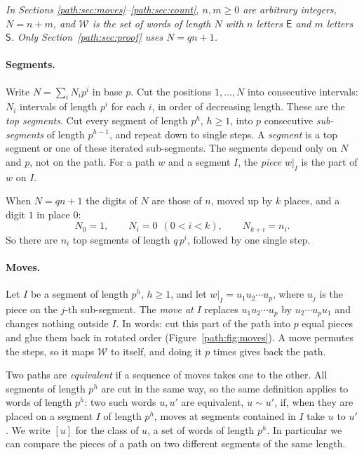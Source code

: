 \documentclass[11pt]{article}
\theoremstyle{definition}
\theoremstyle{remark}
\numberwithin{equation}{section}
\numberwithin{figure}{section}
\newcommand{\E}{\textsf{E}}
\newcommand{\Ss}{\textsf{S}}
\newcommand{\W}{\mathcal{W}}
\begin{document}
\emph{In Sections \ref{path:sec:moves}--\ref{path:sec:count}, $n,m\ge 0$ are arbitrary integers, $N=n+m$, and $\W$ is the set of words of length $N$
with $n$ letters $\E$ and $m$ letters $\Ss$. Only Section~\ref{path:sec:proof} uses $N=qn+1$.}

\paragraph{Segments.} Write $N=\sum_i N_ip^i$ in base $p$. Cut the positions $1,\dots,N$ into consecutive intervals:
$N_i$ intervals of length $p^i$ for each $i$, in order of decreasing length. These are the \emph{top segments}.
Cut every segment of length $p^h$, $h\ge1$, into $p$ consecutive \emph{sub-segments} of length $p^{h-1}$, and
repeat down to single steps. A \emph{segment} is a top segment or one of these iterated sub-segments.
The segments depend only on $N$ and $p$, not on the path. For a path $w$ and a segment $I$, the
\emph{piece} $w|_I$ is the part of $w$ on $I$.

When $N=qn+1$ the digits of $N$ are those of $n$, moved up by $k$ places, and a digit $1$ in place $0$:
\begin{equation}\label{path:eq:digitsN}
N_0=1,\qquad N_i=0\ \ (0<i<k),\qquad N_{k+i}=n_i .
\end{equation}
So there are $n_i$ top segments of length $q\,p^i$, followed by one single step.

\paragraph{Moves.} Let $I$ be a segment of length $p^h$, $h\ge 1$, and let $w|_I=u_1u_2\cdots u_p$, where $u_j$
is the piece on the $j$-th sub-segment. The \emph{move at $I$} replaces $u_1u_2\cdots u_p$ by $u_2\cdots u_pu_1$ and
changes nothing outside $I$. In words: cut this part of the path into $p$ equal pieces and glue them back in
rotated order (Figure~\ref{path:fig:moves}). A move permutes the steps, so it maps $\W$ to itself, and doing it $p$ times
gives back the path.

Two paths are \emph{equivalent} if a sequence of moves takes one to the other. All segments of length $p^h$ are
cut in the same way, so the same definition applies to words of length $p^h$: two such words $u,u'$ are
equivalent, $u\sim u'$, if, when they are placed on a segment $I$ of length $p^h$, moves at segments contained in $I$
take $u$ to $u'$. We write $[u]$ for the class of $u$, a set of words of length $p^h$. In particular we can
compare the pieces of a path on two different segments of the same length.
\end{document}
